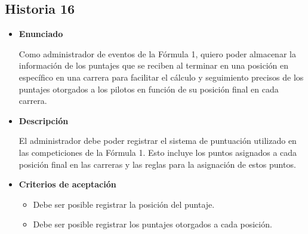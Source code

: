 \documentclass{article}
\begin{document}
	\subsection{Historia 16}
	\begin{itemize}
		
		\item \large{\textbf{Enunciado}}
		\begin{description}
			Como administrador de eventos de la Fórmula 1, quiero poder almacenar la información de los puntajes que se reciben al terminar en una posición en específico en una carrera para facilitar el cálculo y seguimiento precisos de los puntajes otorgados a los pilotos en función de su posición final en cada carrera.

		\end{description}
		
		\item \large{\textbf{Descripción}}
		\begin{description}
			El administrador debe poder registrar el sistema de puntuación utilizado en las competiciones de la Fórmula 1. Esto incluye los puntos asignados a cada posición final en las carreras y las reglas para la asignación de estos puntos.

		\end{description}
		
		\item \large{\textbf{Criterios de aceptación}}
		\begin{itemize}
			\item Debe ser posible registrar la posición del puntaje.
			\item Debe ser posible registrar los puntajes otorgados a cada posición.
			
		\end{itemize}
		
	\end{itemize}
	
\end{document}
